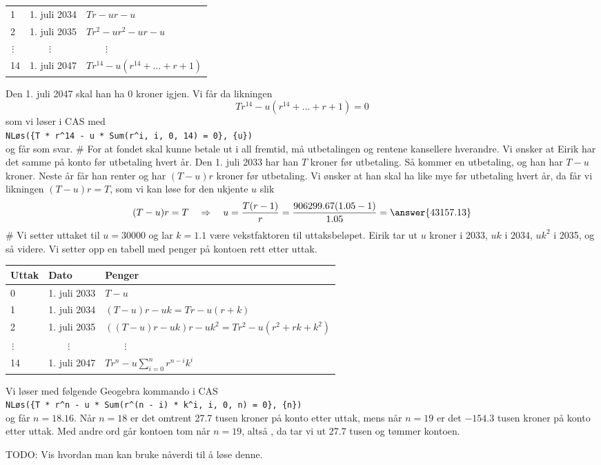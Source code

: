 \begin{easylist}[enumerate]
\begin{center}
\begin{tabular}{lll}
			1 & 1. juli 2034 & $Tr - ur - u$ \\
			2 & 1. juli 2035 & $Tr^2 -ur^2 - ur - u$ \\
			$\, \vdots$ & $\qquad \vdots$ & $\qquad \vdots$ \\
			14 & 1. juli 2047 & $Tr^{14} - u \left(r^{14} + \dots + r + 1\right)$  
		\end{tabular}
	\end{center}
	 Den 1. juli 2047 skal han ha $0$ kroner igjen. Vi får da likningen 
	 \begin{equation*}
	 	Tr^{14} - u \left(r^{14} + \dots + r + 1\right) = 0
	 \end{equation*}
	 som vi løser i CAS med \\
	 \verb|NLøs({T * r^14 - u * Sum(r^i, i, 0, 14) = 0}, {u})| \\
	 og får  som svar.
	# For at fondet skal kunne betale ut i all fremtid, må utbetalingen og rentene kansellere hverandre.
	Vi ønsker at Eirik har det samme på konto før utbetaling hvert år.
	Den 1. juli 2033 har han $T$ kroner før utbetaling. 
	Så kommer en utbetaling, og han har $T - u$ kroner.
	Neste år får han renter og har $(T-u)r$ kroner før utbetaling.
	Vi ønsker at han skal ha like mye før utbetaling hvert år, da får vi likningen $(T - u)r = T$, som vi kan løse for den ukjente $u$ slik
	\begin{equation*}
		(T - u)r = T \quad \Rightarrow \quad u = \frac{T(r-1)}{r}
		 = \frac{906299.67(1.05-1)}{1.05} = \answer{43157.13}
	\end{equation*}
	# Vi setter uttaket til $u = 30000$ og lar $k = 1.1$ være vekstfaktoren til uttaksbeløpet.
	Eirik tar ut $u$ kroner i 2033, $uk$ i 2034, $uk^2$ i 2035, og så videre.
	Vi setter opp en tabell med penger på kontoen rett etter uttak.
	\begin{center}
	\begin{tabular}{lll}
		\textbf{Uttak} & \textbf{Dato} & \textbf{Penger} \\ \hline
		0 & 1. juli 2033 & $T - u$ \\
		1 & 1. juli 2034 & $(T-u)r - uk = Tr - u(r + k)$ \\
		2 & 1. juli 2035 & $((T-u)r - uk)r - uk^2 = Tr^2 - u(r^2 +rk + k^2)$ \\
		$\, \vdots$ & $\qquad \vdots$ & $\qquad \vdots$ \\
		14 & 1. juli 2047 & $Tr^n - u \sum_{i=0}^{n} r^{n-i} k^i$  
	\end{tabular}
	\end{center}
	Vi løser med følgende Geogebra kommando i CAS \\
	\verb|NLøs({T * r^n - u * Sum(r^(n - i) * k^i, i, 0, n) = 0}, {n})| \\
	og får $n = 18.16$.
	Når $n = 18$ er det omtrent 27.7 tusen kroner på konto etter uttak, mens når $n = 19$ er det $-154.3$ tusen kroner på konto etter uttak.
	Med andre ord går kontoen tom når $n=19$, altså , da tar vi ut 27.7 tusen og tømmer kontoen.
	
	TODO: Vis hvordan man kan bruke nåverdi til å løse denne. 
\end{easylist}

